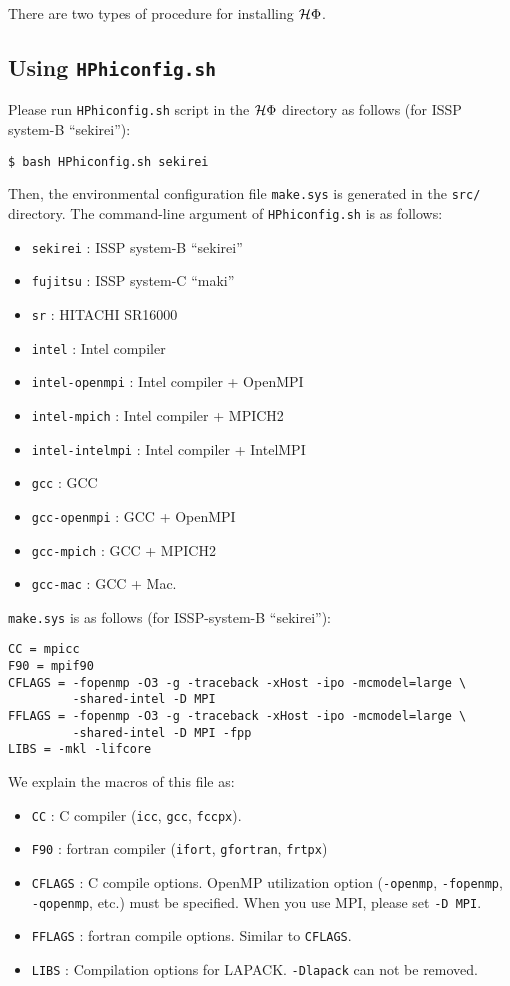 There are two types of procedure for installing $\mathcal{H} \Phi$.

\subsection{Using \texttt{HPhiconfig.sh}}

Please run \verb|HPhiconfig.sh| script in the $\mathcal{H} \Phi$ directory as follows
(for ISSP system-B ``sekirei''):
\begin{verbatim}
$ bash HPhiconfig.sh sekirei
\end{verbatim}
Then, the environmental configuration file \verb|make.sys| is generated in 
the \verb|src/| directory.
The command-line argument of \verb|HPhiconfig.sh| is as follows:
\begin{itemize}
\item \verb|sekirei| : ISSP system-B ``sekirei''
\item \verb|fujitsu| : ISSP system-C ``maki''
\item \verb|sr| : HITACHI SR16000
\item \verb|intel| : Intel compiler
\item \verb|intel-openmpi| : Intel compiler + OpenMPI
\item \verb|intel-mpich| : Intel compiler + MPICH2
\item \verb|intel-intelmpi| : Intel compiler + IntelMPI
\item \verb|gcc| : GCC
\item \verb|gcc-openmpi| : GCC + OpenMPI
\item \verb|gcc-mpich| : GCC + MPICH2
\item \verb|gcc-mac| : GCC + Mac.
\end{itemize}

\verb|make.sys| is as follows (for ISSP-system-B ``sekirei''):
\begin{verbatim}
CC = mpicc
F90 = mpif90
CFLAGS = -fopenmp -O3 -g -traceback -xHost -ipo -mcmodel=large \
         -shared-intel -D MPI
FFLAGS = -fopenmp -O3 -g -traceback -xHost -ipo -mcmodel=large \
         -shared-intel -D MPI -fpp
LIBS = -mkl -lifcore
\end{verbatim}
We explain the macros of this file as: 
\begin{itemize}
\item \verb|CC| : C compiler (\verb|icc|, \verb|gcc|, \verb|fccpx|).
\item \verb|F90| : fortran compiler (\verb|ifort|, \verb|gfortran|, \verb|frtpx|)
\item \verb|CFLAGS| : C compile options.
  OpenMP utilization option (\verb|-openmp|, \verb|-fopenmp|, \verb|-qopenmp|, etc.)
  must be specified.
  When you use MPI, please set \verb|-D MPI|.
\item \verb|FFLAGS| : fortran compile options. Similar to \verb|CFLAGS|. 
\item \verb|LIBS| : Compilation options for LAPACK. \verb|-Dlapack| can not be removed.
\end{itemize}


